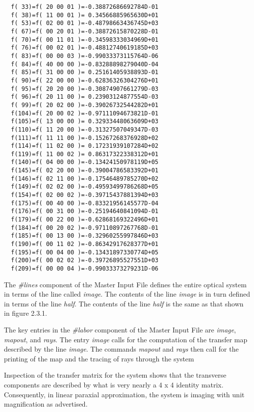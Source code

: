 {\begin{verbatim}
  f( 33)=f( 20 00 01 )=-0.38872686692784D-01
  f( 38)=f( 11 00 01 )= 0.34566885965630D+01
  f( 53)=f( 02 00 01 )=-0.48798663436745D+03
  f( 67)=f( 00 20 01 )=-0.38872615870228D-01
  f( 70)=f( 00 11 01 )=-0.34598333034969D+01
  f( 76)=f( 00 02 01 )=-0.48812740619185D+03
  f( 83)=f( 00 00 03 )=-0.99033373115764D-06
  f( 84)=f( 40 00 00 )=-0.83288898279040D-04
  f( 85)=f( 31 00 00 )= 0.25161405938893D-01
  f( 90)=f( 22 00 00 )=-0.62836326304276D+01
  f( 95)=f( 20 20 00 )=-0.30874907661279D-03
  f( 96)=f( 20 11 00 )= 0.23903124877554D-03
  f( 99)=f( 20 02 00 )=-0.39026732544282D+01
  f(104)=f( 20 00 02 )=-0.97111094673821D-01
  f(105)=f( 13 00 00 )= 0.32933448063609D+03
  f(110)=f( 11 20 00 )=-0.31327507049347D-03
  f(111)=f( 11 11 00 )=-0.15267268376928D+02
  f(114)=f( 11 02 00 )= 0.17231939107284D+02
  f(119)=f( 11 00 02 )= 0.86317322338312D+01
  f(140)=f( 04 00 00 )=-0.13424150978119D+05
  f(145)=f( 02 20 00 )=-0.39004786583392D+01
  f(146)=f( 02 11 00 )=-0.17546489785270D+02
  f(149)=f( 02 02 00 )=-0.49593499786268D+05
  f(154)=f( 02 00 02 )=-0.39715437881394D+03
  f(175)=f( 00 40 00 )=-0.83321956145577D-04
  f(176)=f( 00 31 00 )=-0.25194640841094D-01
  f(179)=f( 00 22 00 )=-0.62868169322496D+01
  f(184)=f( 00 20 02 )=-0.97110897267768D-01
  f(185)=f( 00 13 00 )=-0.32960255997846D+03
  f(190)=f( 00 11 02 )=-0.86342917628377D+01
  f(195)=f( 00 04 00 )=-0.13431897330774D+05
  f(200)=f( 00 02 02 )=-0.39726895527551D+03
  f(209)=f( 00 00 04 )=-0.99033373279231D-06
\end{verbatim}}

     The {\em \#lines} component of the Master Input File defines the entire
optical system in terms of the line called {\em image}.  The contents of the line
{\em image } is in turn defined in terms of the line {\em half}.  The contents of the
line {\em half } is the same as that shown in figure 2.3.1.

     The key entries in the {\em \#labor} component of the Master Input File are {\em image}, {\em mapout}, and {\em rays}.  The entry {\em image } calls for the computation of the transfer map described by the line {\em image}.  The commands {\em mapout } and {\em rays } then call for the printing of the map and the tracing of rays through the system

   Inspection of the transfer matrix for the system shows that the transverse components are described by what is very nearly a 4 x 4 identity
matrix.  Consequently, in linear paraxial approximation, the system is
imaging with unit magnification as advertised.

